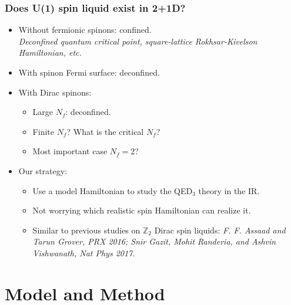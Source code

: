 \documentclass[xcolor=table, 10pt, aspectratio=43]{beamer}
\begin{document}
\begin{frame}
  \frametitle{Does U(1) spin liquid exist in 2+1D?}
  \begin{itemize}
    \item Without fermionic spinons: confined.\\
    \emph{Deconfined quantum critical point, square-lattice Rokhsar-Kivelson Hamiltonian, etc.}
    \item With spinon Fermi surface: deconfined.
    \item With Dirac spinons:
    \begin{itemize}
      \item Large $N_f$: deconfined.
      \item Finite $N_f$? What is the critical $N_f$?
      \item Most important case $N_f=2$?
    \end{itemize}
    \item Our strategy:
    \begin{itemize}
      \item Use a model Hamiltonian to study the QED$_3$ theory in the IR.
      \item Not worrying which realistic spin Hamiltonian can realize it.
      \item Similar to previous studies on $\mathbb Z_2$ Dirac spin liquids:
      \emph{F. F. Assaad and Tarun Grover, PRX 2016; Snir Gazit, Mohit Randeria, and Ashvin Vishwanath, Nat Phys 2017.}
    \end{itemize}
  \end{itemize}
\end{frame}

\section{Model and Method}
\end{document}
